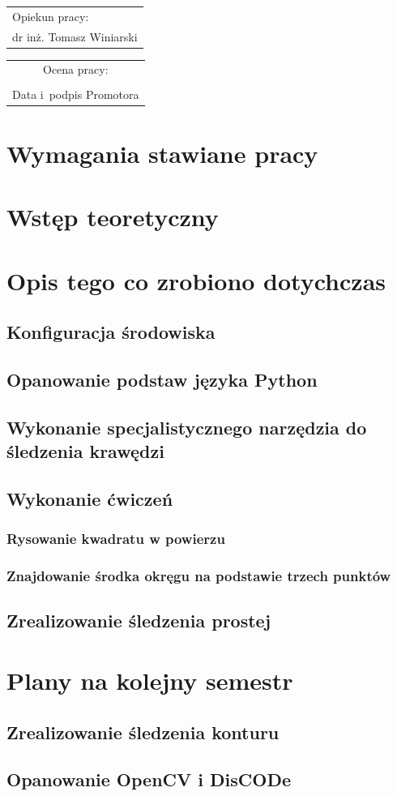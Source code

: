 \documentclass[12pt, a4paper, twoside]{book}
\begin{document}
\begin{titlepage}
			\vspace{20mm}
			\begin{flushright}
				\begin{tabular}{l}
					Opiekun pracy:\\
					\large dr inż. Tomasz Winiarski
				\end{tabular}
			\end{flushright}
			\vfill
			\begin{tabular}{c}
				\scriptsize Ocena pracy: \dotfill\\[10mm]
				\scriptsize \makebox[55mm]{\dotfill}\\
				\scriptsize Data i~podpis Promotora\\
				
			\end{tabular}
		\end{titlepage} 	


\newpage
\tableofcontents

\chapter{Wymagania stawiane pracy}
\chapter{Wstęp teoretyczny}
\chapter{Opis tego co zrobiono dotychczas}
	\section{Konfiguracja środowiska}
	\section{Opanowanie podstaw języka Python}
	\section{Wykonanie specjalistycznego narzędzia do śledzenia krawędzi}
	\section{Wykonanie ćwiczeń}
		\subsection{Rysowanie kwadratu w powierzu}
		\subsection{Znajdowanie środka okręgu na podstawie trzech punktów}
	\section{Zrealizowanie śledzenia prostej}
\chapter{Plany na kolejny semestr}
	\section{Zrealizowanie śledzenia konturu}
	\section{Opanowanie OpenCV i DisCODe}
\end{document}
